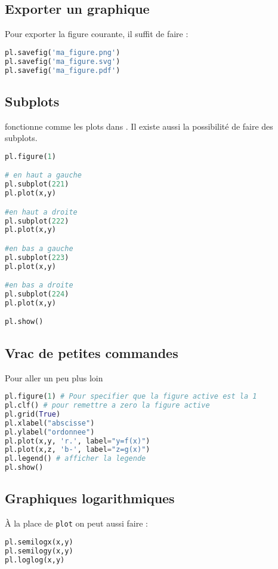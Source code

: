 \documentclass[a4paper,twoside]{article}
\begin{document}
\subsection{Exporter un graphique}
Pour exporter la figure courante, il suffit de faire :
\begin{lstlisting}[language=python]
pl.savefig('ma_figure.png')
pl.savefig('ma_figure.svg')
pl.savefig('ma_figure.pdf')
\end{lstlisting}

\subsection{Subplots}
 fonctionne comme les plots dans . Il existe aussi la possibilité de faire des subplots.

\begin{lstlisting}[language=python]
pl.figure(1)

# en haut a gauche
pl.subplot(221)
pl.plot(x,y)

#en haut a droite
pl.subplot(222)
pl.plot(x,y)

#en bas a gauche
pl.subplot(223)
pl.plot(x,y)

#en bas a droite
pl.subplot(224)
pl.plot(x,y)

pl.show()
\end{lstlisting}

\subsection{Vrac de petites commandes}

Pour aller un peu plus loin
\begin{lstlisting}[language=python]
pl.figure(1) # Pour specifier que la figure active est la 1
pl.clf() # pour remettre a zero la figure active
pl.grid(True)
pl.xlabel("abscisse")
pl.ylabel("ordonnee")
pl.plot(x,y, 'r.', label="y=f(x)")
pl.plot(x,z, 'b-', label="z=g(x)")
pl.legend() # afficher la legende
pl.show()
\end{lstlisting}

\subsection{Graphiques logarithmiques}

À la place de \verb|plot| on peut aussi faire :
\begin{lstlisting}[language=python]
pl.semilogx(x,y)
pl.semilogy(x,y)
pl.loglog(x,y)
\end{lstlisting}
\end{document}
